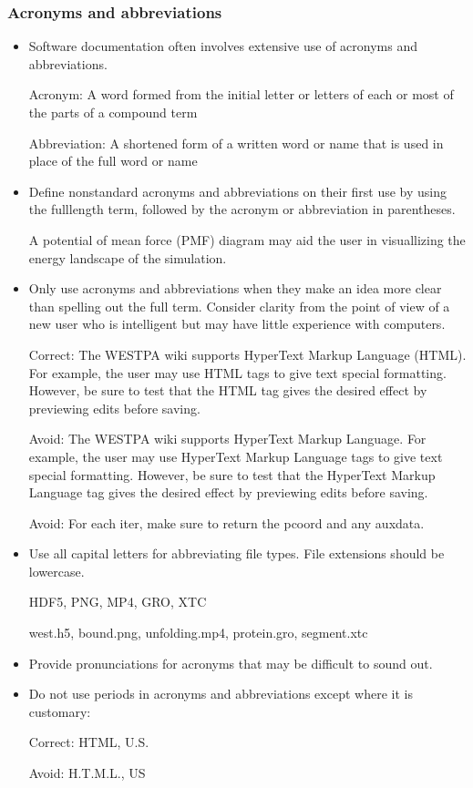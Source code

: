 \documentclass[letterpaper,10pt,english]{sphinxmanual}
\begin{document}
\subsubsection{Acronyms and abbreviations}
\label{\detokenize{development/style_guide:acronyms-and-abbreviations}}\begin{itemize}
\item {} 
Software documentation often involves extensive use of acronyms and
abbreviations.

Acronym: A word formed from the initial letter or letters of each or most of
the parts of a compound term

Abbreviation: A shortened form of a written word or name that is used in
place of the full word or name

\item {} 
Define non\sphinxhyphen{}standard acronyms and abbreviations on their first use by using
the full\sphinxhyphen{}length term, followed by the acronym or abbreviation in parentheses.

A potential of mean force (PMF) diagram may aid the user in visuallizing the
energy landscape of the simulation.

\item {} 
Only use acronyms and abbreviations when they make an idea more clear than
spelling out the full term. Consider clarity from the point of view of a new
user who is intelligent but may have little experience with computers.

Correct: The WESTPA wiki supports HyperText Markup Language (HTML). For
example, the user may use HTML tags to give text special formatting. However,
be sure to test that the HTML tag gives the desired effect by previewing
edits before saving.

Avoid: The WESTPA wiki supports HyperText Markup Language. For example, the
user may use HyperText Markup Language tags to give text special formatting.
However, be sure to test that the HyperText Markup Language tag gives the
desired effect by previewing edits before saving.

Avoid: For each iter, make sure to return the pcoord and any auxdata.

\item {} 
Use all capital letters for abbreviating file types. File extensions should
be lowercase.

HDF5, PNG, MP4, GRO, XTC

west.h5, bound.png, unfolding.mp4, protein.gro, segment.xtc

\item {} 
Provide pronunciations for acronyms that may be difficult to sound out.

\item {} 
Do not use periods in acronyms and abbreviations except where it is
customary:

Correct: HTML, U.S.

Avoid: H.T.M.L., US

\end{itemize}
\end{document}
